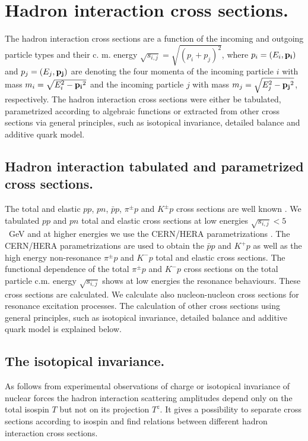 \section{Hadron interaction cross sections.}

\hspace{1.0em}The hadron interaction cross sections are a function of
the incoming and outgoing particle types and their c. m. energy
$\sqrt{s_{i,j}} = \sqrt{(p_i + p_j)^2}$, where $p_i = (E_i, {\bf p_i})$
and $p_j=(E_j, {\bf p_j})$ are denoting the four momenta of the incoming
particle $i$ with mass $m_i = \sqrt{E^2_i - {\bf p_i}^2}$ and the
incoming particle $j$ with mass $m_j = \sqrt{E^2_j - {\bf p_j}^2}$,
respectively.  The hadron interaction cross sections were either be
tabulated, parametrized according to algebraic functions 
 or extracted from other cross
sections via general principles, such as isotopical invariance,
detailed balance and additive quark model.

\subsection{Hadron interaction tabulated and parametrized cross sections.}

\hspace{1.0em}The total  and elastic $pp$, $pn$, $\bar{p}p$,
$\pi^{\pm}p$ and $K^{\pm}p$ 
cross sections are well known \cite{PDG96}. 
 We tabulated $pp$ and $pn$ total and 
elastic cross sections at low energies $\sqrt{s_{i,j}} < 5$ \ GeV and at 
higher energies we use the CERN/HERA parametrizations \cite{PDG96}. 
The CERN/HERA
parametrizations \cite{PDG96} are used to obtain the $\bar{p}p$ 
and $K^{+}p$ as well as the high energy
 non-resonance $\pi^{\pm}p$ and $K^{-}p$ 
total and elastic cross sections.
The functional
dependence of the total $\pi^{\pm}p$ and $K^{-}p$ cross sections 
 on the total particle c.m. energy $\sqrt{s_{i,j}}$ shows at
low energies the resonance behaviours. These cross sections are calculated.
We calculate also nucleon-nucleon cross sections for resonance excitation 
processes.
The calculation of other cross
sections using general principles, such as isotopical invariance,
detailed balance and additive quark model is explained below.

\subsection{The isotopical invariance.}

\hspace{1.0em}As follows from experimental observations of charge or
isotopical invariance of nuclear forces the hadron interaction
scattering amplitudes depend only on the total isospin $T$ but not on
its projection $T^z$.  It gives a possibility to separate cross sections
according to isospin and find relations between different hadron
interaction cross sections.

